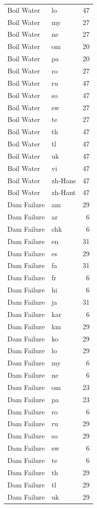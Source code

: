 \begin{longtable}{p{3cm} p{3cm} r}
Boil Water & lo & 47 \\
Boil Water & my & 27 \\
Boil Water & ne & 27 \\
Boil Water & om & 20 \\
Boil Water & pa & 20 \\
Boil Water & ro & 27 \\
Boil Water & ru & 47 \\
Boil Water & so & 47 \\
Boil Water & sw & 27 \\
Boil Water & te & 27 \\
Boil Water & th & 47 \\
Boil Water & tl & 47 \\
Boil Water & uk & 47 \\
Boil Water & vi & 47 \\
Boil Water & zh-Hans & 47 \\
Boil Water & zh-Hant & 47 \\
Dam Failure & am & 29 \\
Dam Failure & ar & 6 \\
Dam Failure & chk & 6 \\
Dam Failure & en & 31 \\
Dam Failure & es & 29 \\
Dam Failure & fa & 31 \\
Dam Failure & fr & 6 \\
Dam Failure & hi & 6 \\
Dam Failure & ja & 31 \\
Dam Failure & kar & 6 \\
Dam Failure & km & 29 \\
Dam Failure & ko & 29 \\
Dam Failure & lo & 29 \\
Dam Failure & my & 6 \\
Dam Failure & ne & 6 \\
Dam Failure & om & 23 \\
Dam Failure & pa & 23 \\
Dam Failure & ro & 6 \\
Dam Failure & ru & 29 \\
Dam Failure & so & 29 \\
Dam Failure & sw & 6 \\
Dam Failure & te & 6 \\
Dam Failure & th & 29 \\
Dam Failure & tl & 29 \\
Dam Failure & uk & 29 \\

\end{longtable}
